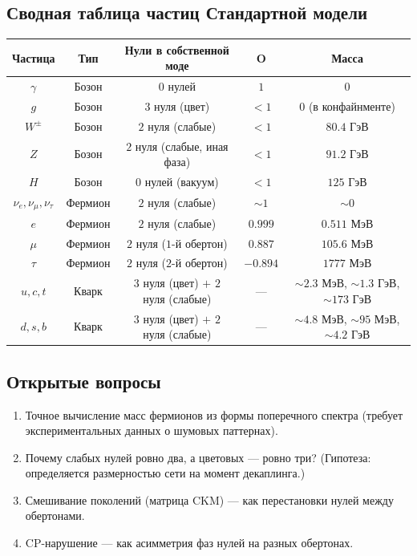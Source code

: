 \documentclass[12pt,a4paper]{article}
\begin{document}
\subsection{Сводная таблица частиц Стандартной модели}

\begin{center}
\begin{tabular}{c|c|c|c|c}
\textbf{Частица} & \textbf{Тип} & \textbf{Нули в собственной моде} & \textbf{O} & \textbf{Масса} \\
\hline
$\gamma$ & Бозон & $0$ нулей & $1$ & $0$ \\
$g$ & Бозон & $3$ нуля (цвет) & $<1$ & $0$ (в конфайнменте) \\
$W^\pm$ & Бозон & $2$ нуля (слабые) & $<1$ & $80.4$ ГэВ \\
$Z$ & Бозон & $2$ нуля (слабые, иная фаза) & $<1$ & $91.2$ ГэВ \\
$H$ & Бозон & $0$ нулей (вакуум) & $<1$ & $125$ ГэВ \\
$\nu_e, \nu_\mu, \nu_\tau$ & Фермион & $2$ нуля (слабые) & $\sim 1$ & $\sim 0$ \\
$e$ & Фермион & $2$ нуля (слабые) & $0.999$ & $0.511$ МэВ \\
$\mu$ & Фермион & $2$ нуля ($1$-й обертон) & $0.887$ & $105.6$ МэВ \\
$\tau$ & Фермион & $2$ нуля ($2$-й обертон) & $-0.894$ & $1777$ МэВ \\
$u, c, t$ & Кварк & $3$ нуля (цвет) $+$ $2$ нуля (слабые) & — & $\sim 2.3$ МэВ, $\sim 1.3$ ГэВ, $\sim 173$ ГэВ \\
$d, s, b$ & Кварк & $3$ нуля (цвет) $+$ $2$ нуля (слабые) & — & $\sim 4.8$ МэВ, $\sim 95$ МэВ, $\sim 4.2$ ГэВ
\end{tabular}
\end{center}

\subsection{Открытые вопросы}

\begin{enumerate}
    \item Точное вычисление масс фермионов из формы поперечного спектра (требует экспериментальных данных о шумовых паттернах).
    \item Почему слабых нулей ровно два, а цветовых — ровно три? (Гипотеза: определяется размерностью сети на момент декаплинга.)
    \item Смешивание поколений (матрица CKM) — как перестановки нулей между обертонами.
    \item CP-нарушение — как асимметрия фаз нулей на разных обертонах.
\end{enumerate}
\end{document}
